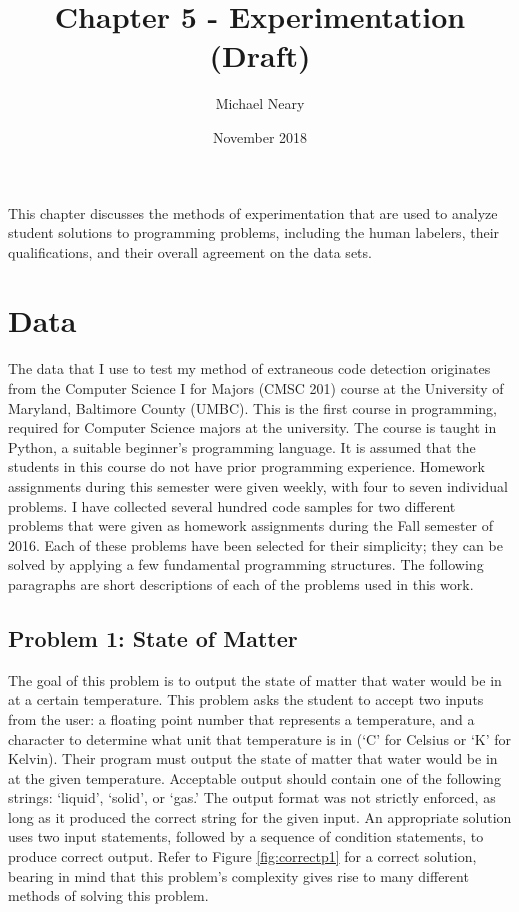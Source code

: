 \documentclass[draft]{article}
\title{Chapter 5 - Experimentation (Draft)}
\author{Michael Neary}
\date{November 2018}
\begin{document}
\maketitle
This chapter discusses the methods of experimentation that are used to analyze student solutions to programming problems, including the human labelers, their qualifications, and their overall agreement on the data sets.

\section{Data}
The data that I use to test my method of extraneous code detection originates from the Computer Science I for Majors (CMSC 201) course at the University of Maryland, Baltimore County (UMBC). This is the first course in programming, required for Computer Science majors at the university. The course is taught in Python, a suitable beginner's programming language. It is assumed that the students in this course do not have prior programming experience. Homework assignments during this semester were given weekly, with four to seven individual problems. I have collected several hundred code samples for two different problems that were given as homework assignments during the Fall semester of 2016. Each of these problems have been selected for their simplicity; they can be solved by applying a few fundamental programming structures. The following paragraphs are short descriptions of each of the problems used in this work.



\subsection{Problem 1: State of Matter}\label{p1desc}
The goal of this problem is to output the state of matter that water would be in at a certain temperature. This problem asks the student to accept two inputs from the user: a floating point number that represents a temperature, and a character to determine what unit that temperature is in (`C' for Celsius or `K' for Kelvin). Their program must output the state of matter that water would be in at the given temperature. Acceptable output should contain one of the following strings: `liquid', `solid', or `gas.' The output format was not strictly enforced, as long as it produced the correct string for the given input. An appropriate solution uses two input statements, followed by a sequence of condition statements, to produce correct output. Refer to Figure \ref{fig:correctp1} for a correct solution, bearing in mind that this problem's complexity gives rise to many different methods of solving this problem.
\end{document}
